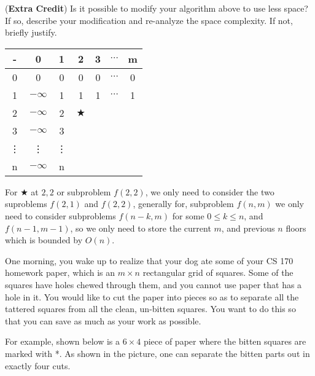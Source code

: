 \documentclass[11pt]{article}
\begin{document}
\begin{subparts}
\subpart (\textbf{Extra Credit}) Is it possible to modify your algorithm above to use less space? If so, describe your modification and re-analyze the space complexity. If not, briefly justify. 
\begin{solution}
    \begin{center}
        \begin{tabular}{ c|c|c|c|c|c|c| } 
        - & 0 & 1 & 2 & 3 & $\cdots$ & m \\ 
        \hline
        0 & 0 & 0 & 0 & 0& $\cdots$ & 0\\ 
        \hline
        1 & $-\infty$ & 1 & 1 & 1 & $\cdots$ & 1\\ 
        \hline
        2 & $-\infty$ & 2 & $\bigstar$ &  &  & \\ 
        \hline
        3 & $-\infty$ & 3 &  &  &  & \\ 
        \hline
        \vdots & \vdots & \vdots &  &  &  & \\  
        \hline
        n & $-\infty$ & n &  &  &  &  \\ 
        \hline
        \end{tabular}
    \end{center}
    For $\bigstar$ at $2, 2$ or subproblem $f(2, 2)$, we only need to consider the two suproblems $f(2, 1)$ and $f(2, 2)$, generally for, subproblem
    $f(n, m)$ we only need to consider subproblems $f(n-k, m)$ for some $0 \le k \le n$, and $f(n-1, m-1)$, so we only need to store the current $m$, and previous $n$ floors which 
    is bounded by $O(n)$.  
\end{solution}
\end{subparts}

\newpage

 One morning, you wake up to realize that your dog ate some of your CS 170 homework paper, which is an $m \times n$ rectangular grid of squares. Some of the squares have holes chewed through them, and you cannot use paper that has a hole in it. You would like to cut the paper into pieces so as to
separate all the tattered squares from all the clean, un-bitten squares. You want to do this so that you can save as much as your work as possible.

For example, shown below is a $6 \times 4$ piece of paper where the bitten squares are marked with *.  As shown in the picture, one can separate the bitten parts out in
exactly four  cuts. \\
\end{document}
